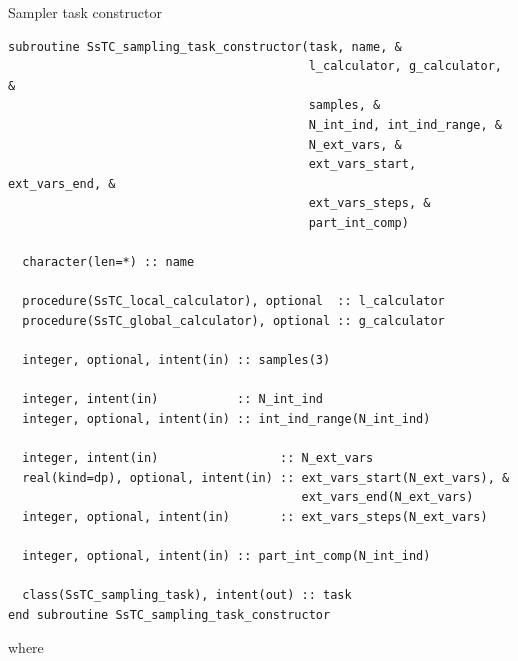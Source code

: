 \documentclass[10pt,a4paper]{article}
\begin{document}
\begin{codebox}{Sampler task constructor}
\begin{lstlisting}[caption={Interface of the sampling task constructor.},captionpos=b]
subroutine SsTC_sampling_task_constructor(task, name, &
                                          l_calculator, g_calculator, &
                                          samples, &
                                          N_int_ind, int_ind_range, &
                                          N_ext_vars, &
                                          ext_vars_start, ext_vars_end, &
                                          ext_vars_steps, &
                                          part_int_comp)

  character(len=*) :: name

  procedure(SsTC_local_calculator), optional  :: l_calculator
  procedure(SsTC_global_calculator), optional :: g_calculator

  integer, optional, intent(in) :: samples(3)

  integer, intent(in)           :: N_int_ind
  integer, optional, intent(in) :: int_ind_range(N_int_ind)

  integer, intent(in)                 :: N_ext_vars
  real(kind=dp), optional, intent(in) :: ext_vars_start(N_ext_vars), &
                                         ext_vars_end(N_ext_vars)
  integer, optional, intent(in)       :: ext_vars_steps(N_ext_vars)

  integer, optional, intent(in) :: part_int_comp(N_int_ind)

  class(SsTC_sampling_task), intent(out) :: task
end subroutine SsTC_sampling_task_constructor
\end{lstlisting}
\end{codebox}
where
\end{document}
